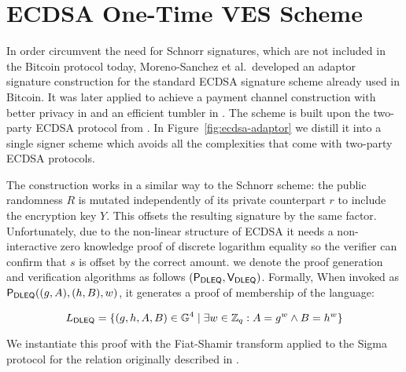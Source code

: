 \section{ECDSA One-Time VES Scheme}
\label{ecdsa-ot-ves-section}

\newcommand{\Pdleq}{\pcalgostyle{P}_{\textsf{DLEQ}}}
\newcommand{\Vdleq}{\pcalgostyle{V}_{\textsf{DLEQ}}}

In order circumvent the need for Schnorr signatures, which are not included in the Bitcoin protocol today, Moreno-Sanchez et al.\  developed an adaptor signature construction for the standard ECDSA signature scheme already used in Bitcoin\cite{ecdsa-scriptless-scripts}.
It was later applied to achieve a payment channel construction with better privacy in \cite{cryptoeprint:2018:472} and an efficient tumbler in \cite{cryptoeprint:2019:589}.
The scheme is built upon the two-party ECDSA protocol from \cite{Lindell2pECDSA}.
In Figure~\ref{fig:ecdsa-adaptor} we distill it into a single signer scheme which avoids all the complexities that come with two-party ECDSA protocols.

The construction works in a similar way to the Schnorr scheme: the public randomness $R$ is mutated independently of its private counterpart $r$ to include the encryption key $Y$.
This offsets the resulting signature by the same factor.
Unfortunately, due to the non-linear structure of ECDSA it needs a non-interactive zero knowledge proof of discrete logarithm equality so the verifier can confirm that $s$ is offset by the correct amount.
we denote the proof generation and verification algorithms as follows $(\Pdleq,\Vdleq)$.
Formally, When invoked as $\Pdleq((g, A),(h,B),w)$, it generates a proof of membership of the language:

\newcommand{\DLEQ}{\textsf{DLEQ}\xspace}
\[ L_{\DLEQ} = \{ (g, h, A, B) \in \G^4 \mid  \exists w \in \ZZ_q : A = g^w \land B = h^w \} \]

We instantiate this proof with the Fiat-Shamir transform applied to the Sigma protocol for the relation originally described in \cite{dleq-proof}.

\newcommand{\Rx}{R_{\mathtt{x}}}
\newcommand{\hatRx}{\hat{R}_\mathtt{x}}
\newcommand{\xcoord}{f}


